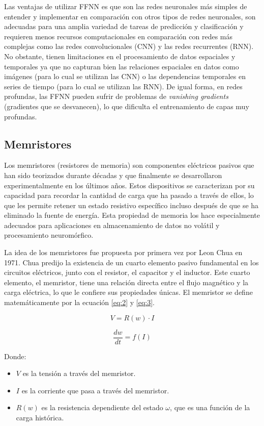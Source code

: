 \documentclass[conference]{IEEEtran}
\begin{document}
Las ventajas de utilizar FFNN es que son las redes neuronales más simples de entender y implementar en comparación con otros tipos de redes neuronales, son adecuadas para una amplia variedad de tareas de predicción y clasificación y requieren menos recursos computacionales en comparación con redes más complejas como las redes convolucionales (CNN) y las redes recurrentes (RNN). No obstante, tienen limitaciones en el procesamiento de datos espaciales y temporales ya que no capturan bien las relaciones espaciales en datos como imágenes (para lo cual se utilizan las CNN) o las dependencias temporales en series de tiempo (para lo cual se utilizan las RNN). De igual forma, en redes profundas, las FFNN pueden sufrir de problemas de \textit{vanishing gradients} (gradientes que se desvanecen), lo que dificulta el entrenamiento de capas muy profundas.

\subsection{Memristores}
Los memristores (resistores de memoria) son componentes eléctricos pasivos que han sido teorizados durante décadas y que finalmente se desarrollaron experimentalmente en los últimos años. Estos dispositivos se caracterizan por su capacidad para recordar la cantidad de carga que ha pasado a través de ellos, lo que les permite retener un estado resistivo específico incluso después de que se ha eliminado la fuente de energía. Esta propiedad de memoria los hace especialmente adecuados para aplicaciones en almacenamiento de datos no volátil y procesamiento neuromórfico.

La idea de los memristores fue propuesta por primera vez por Leon Chua en 1971. Chua predijo la existencia de un cuarto elemento pasivo fundamental en los circuitos eléctricos, junto con el resistor, el capacitor y el inductor. Este cuarto elemento, el memristor, tiene una relación directa entre el flujo magnético y la carga eléctrica, lo que le confiere sus propiedades únicas. El memristor se define matemáticamente por la ecuación \ref{eq:2} y \ref{eq:3}.

\begin{equation}
	V = R(w) \cdot I
	\label{eq:2}
\end{equation}

\begin{equation}
	\frac{dw}{dt} = f(I)
	\label{eq:3}
\end{equation}

Donde:
\begin{itemize}
	\item $V$ es la tensión a través del memristor.
	\item $I$ es la corriente que pasa a través del memristor.
	\item $R(w)$ es la resistencia dependiente del estado $\omega$, que es una función de la carga histórica.
\end{itemize}
\end{document}
